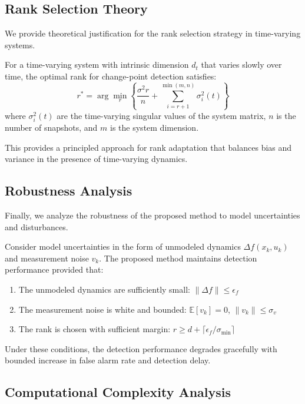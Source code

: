\subsection{Rank Selection Theory}

We provide theoretical justification for the rank selection strategy in time-varying systems.

\begin{proposition}\label{prop:rank}
For a time-varying system with intrinsic dimension \(d_t\) that varies slowly over time, the optimal rank for change-point detection satisfies:
\[r^* = \arg\min_r \left\{ \frac{\sigma^2 r}{n} + \sum_{i=r+1}^{\min(m,n)} \sigma_i^2(t) \right\}\]
where \(\sigma_i^2(t)\) are the time-varying singular values of the system matrix, \(n\) is the number of snapshots, and \(m\) is the system dimension.

This provides a principled approach for rank adaptation that balances bias and variance in the presence of time-varying dynamics.
\end{proposition}

\subsection{Robustness Analysis}

Finally, we analyze the robustness of the proposed method to model uncertainties and disturbances.

\begin{theorem}
\label{thm:robustness}
Consider model uncertainties in the form of unmodeled dynamics \(\Delta f(x_k, u_k)\) and measurement noise \(v_k\). The proposed method maintains detection performance provided that:
\begin{enumerate}
    \item The unmodeled dynamics are sufficiently small: \(\|\Delta f\| \leq \epsilon_f\)
    \item The measurement noise is white and bounded: \(\mathbb{E}[v_k] = 0\), \(\|v_k\| \leq \sigma_v\)
    \item The rank is chosen with sufficient margin: \(r \geq d + \lceil \epsilon_f/\sigma_{\min} \rceil\)
\end{enumerate}
Under these conditions, the detection performance degrades gracefully with bounded increase in false alarm rate and detection delay.
\end{theorem}

\subsection{Computational Complexity Analysis}

